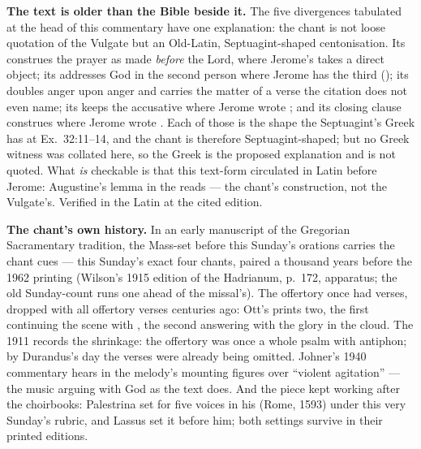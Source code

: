 \textbf{The text is older than the Bible beside it.} The five divergences
tabulated at the head of this commentary have one explanation: the chant is not
loose quotation of the Vulgate but an Old-Latin, Septuagint-shaped
centonisation. Its  construes
the prayer as made \textit{before} the Lord, where Jerome's  takes a direct object; its  addresses God in the second person where Jerome has the third
(); its  doubles anger
upon anger and carries the matter of a verse the citation does not even name;
its  keeps the accusative where Jerome
wrote ; and its closing clause construes  where Jerome wrote . Each of those is the shape the Septuagint's Greek has
at Ex.\ 32:11--14, and the chant is therefore Septuagint-shaped; but no Greek
witness was collated here, so the Greek is the proposed explanation and is not
quoted. What \textit{is} checkable is that this text-form
circulated in Latin before Jerome: Augustine's lemma in the
 reads  --- the chant's construction, not the
Vulgate's. Verified in the Latin at the cited edition.

\textbf{The chant's own history.} In an
early manuscript of the Gregorian Sacramentary tradition, the Mass-set
before this Sunday's orations carries the chant cues  --- this Sunday's exact four chants, paired a thousand years
before the 1962 printing (Wilson's 1915 edition of the Hadrianum, p.~172,
apparatus; the old Sunday-count runs one ahead of the missal's). The
offertory once had verses, dropped with all offertory verses centuries ago:
Ott's  prints two, the first continuing the scene with
, the
second answering with the glory in the cloud. The 1911  records the shrinkage: the offertory was once a whole psalm
with antiphon; by Durandus's day the verses were already being omitted.
Johner's 1940 commentary hears in the melody's mounting figures over
 ``violent agitation'' --- the music arguing with God as the
text does. And the piece kept working after the choirbooks: Palestrina set
 for five voices in his  (Rome, 1593) under this very Sunday's rubric, and Lassus set it before
him; both settings survive in their printed editions.


